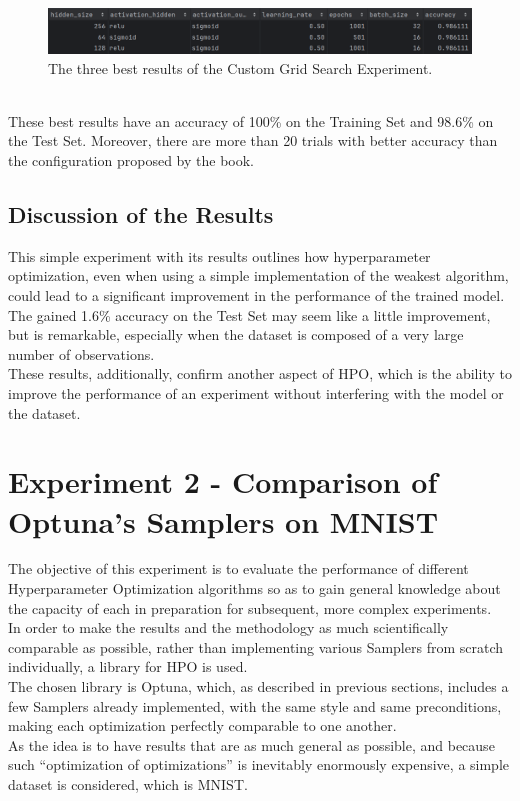 \begin{figure}[b]
	\centering
	\includegraphics[width=15cm]{figures/figure-4.1.2.png}
	\caption[Best Results of Custom Grid Search Experiment]{The three best results of the Custom Grid Search Experiment.}
	\label{fig:figure-4.1.2}
\end{figure}
\\[0.3cm]These best results have an accuracy of 100\% on the Training Set and 98.6\% on the Test Set. Moreover, there are more than 20 trials with better accuracy than the configuration proposed by the book.

\subsection{Discussion of the Results}

This simple experiment with its results outlines how hyperparameter optimization, even when using a simple implementation of the weakest algorithm, could lead to a significant improvement in the performance of the trained model.
\\[0.3cm]The gained 1.6\% accuracy on the Test Set may seem like a little improvement, but is remarkable, especially when the dataset is composed of a very large number of observations.
\\[0.3cm]These results, additionally, confirm another aspect of HPO, which is the ability to improve the performance of an experiment without interfering with the model or the dataset.

\section[Experiment 2 - Comparison of Optuna's Samplers]{Experiment 2 - Comparison of Optuna's Samplers on MNIST}\label{sec:Experiment2-4.2}

The objective of this experiment is to evaluate the performance of different Hyperparameter Optimization algorithms so as to gain general knowledge about the capacity of each in preparation for subsequent, more complex experiments.
\\[0.3cm]In order to make the results and the methodology as much scientifically comparable as possible, rather than implementing various Samplers from scratch individually, a library for HPO is used.
\\[0.3cm]The chosen library is Optuna, which, as described in previous sections, includes a few Samplers already implemented, with the same style and same preconditions, making each optimization perfectly comparable to one another.
\\[0.3cm]As the idea is to have results that are as much general as possible, and because such “optimization of optimizations” is inevitably enormously expensive, a simple dataset is considered, which is MNIST.

